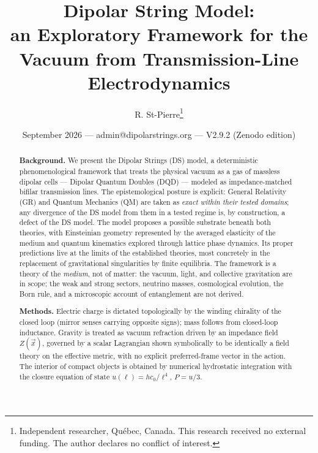 \documentclass[11pt,a4paper]{article}
\title{\textbf{Dipolar String Model:}\\ \large an Exploratory Framework for the Vacuum from Transmission-Line Electrodynamics}
\author{R. St-Pierre\thanks{Independent researcher, Qu\'ebec, Canada. This research received no external funding. The author declares no conflict of interest.}}
\date{September 2026 --- admin@dipolarstrings.org --- V2.9.2 (Zenodo edition)}
\theoremstyle{plain}
\theoremstyle{remark}
\begin{document}
\maketitle

\begin{abstract}
\noindent\textbf{Background.} We present the Dipolar Strings (DS) model, a deterministic phenomenological framework that treats the physical vacuum as a gas of massless dipolar cells --- Dipolar Quantum Doubles (DQD) --- modeled as impedance-matched bifilar transmission lines. The epistemological posture is explicit: General Relativity (GR) and Quantum Mechanics (QM) are taken as \emph{exact within their tested domains}; any divergence of the DS model from them in a tested regime is, by construction, a defect of the DS model. The model proposes a possible substrate beneath both theories, with Einsteinian geometry represented by the averaged elasticity of the medium and quantum kinematics explored through lattice phase dynamics. Its proper predictions live at the limits of the established theories, most concretely in the replacement of gravitational singularities by finite equilibria. The framework is a theory of the \emph{medium}, not of matter: the vacuum, light, and collective gravitation are in scope; the weak and strong sectors, neutrino masses, cosmological evolution, the Born rule, and a microscopic account of entanglement are not derived.

\noindent\textbf{Methods.} Electric charge is dictated topologically by the winding chirality of the closed loop (mirror senses carrying opposite signs); mass follows from closed-loop inductance. Gravity is treated as vacuum refraction driven by an impedance field $Z(\vec{x})$, governed by a scalar Lagrangian shown symbolically to be identically a field theory on the effective metric, with no explicit preferred-frame vector in the action. The interior of compact objects is obtained by numerical hydrostatic integration with the closure equation of state $u(\ell) = hc_0/\ell^4$, $P = u/3$.


\end{abstract}
\end{document}
